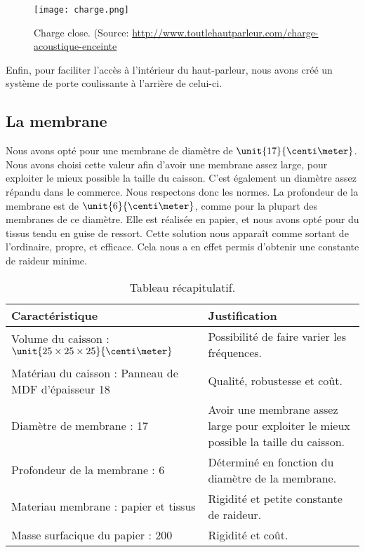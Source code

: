 \begin{figure}[!hbt]
	\centering
	\texttt{[image: charge.png]}
	\caption{Charge close. (Source: \url{http://www.toutlehautparleur.com/charge-acoustique-enceinte}}
	\label{charge}
\end{figure}

Enfin, pour faciliter l'accès à l'intérieur du haut-parleur, nous avons créé un système de porte coulissante
à l'arrière de celui-ci.

\subsection{La membrane}
Nous avons opté pour une membrane de diamètre de $\unit{17}{\centi\meter}$. Nous avons choisi cette valeur afin
d'avoir une membrane assez large, pour exploiter le mieux possible la taille du caisson. C'est également un
diamètre assez répandu dans le commerce\cite{tlhp}. Nous respectons donc les normes.
La profondeur de la membrane est de $\unit{6}{\centi\meter}$, comme pour la plupart des membranes de ce
diamètre\cite{tlhp}. Elle est réalisée en papier, et nous avons opté pour du tissus tendu en guise de ressort.
Cette solution nous apparaît comme sortant de l'ordinaire, propre, et efficace. Cela nous a en effet permis
d'obtenir une constante de raideur minime.

\begin{table}[htb!]
	\centering
	\begin{tabularx}{\textwidth}{|X|X|}
	\hline
	\textbf{Caractéristique} & \textbf{Justification} \\
	\hline
	Volume du caisson : $\unit{25\times25\times25}{\centi\meter}$ & Possibilité de faire varier les fréquences. \\
	\hline
	Matériau du caisson : Panneau de MDF
	d'épaisseur \unit{18}{\milli\meter} & Qualité, robustesse et coût. \\
	\hline
	Diamètre de membrane : \unit{17}{\centi\meter} & Avoir une membrane assez large pour exploiter le mieux possible la taille du caisson. \\
	\hline
	Profondeur de la membrane : \unit{6}{\centi\meter} & Déterminé en fonction du diamètre de la membrane. \\
	\hline
	Materiau membrane : papier et tissus & Rigidité et petite constante de raideur. \\
	\hline
	Masse surfacique du papier : \unit{200}{\gram\per\meter\squared} & Rigidité et coût. \\
	\hline
	\end{tabularx}
	\caption{Tableau récapitulatif.}
\end{table}

